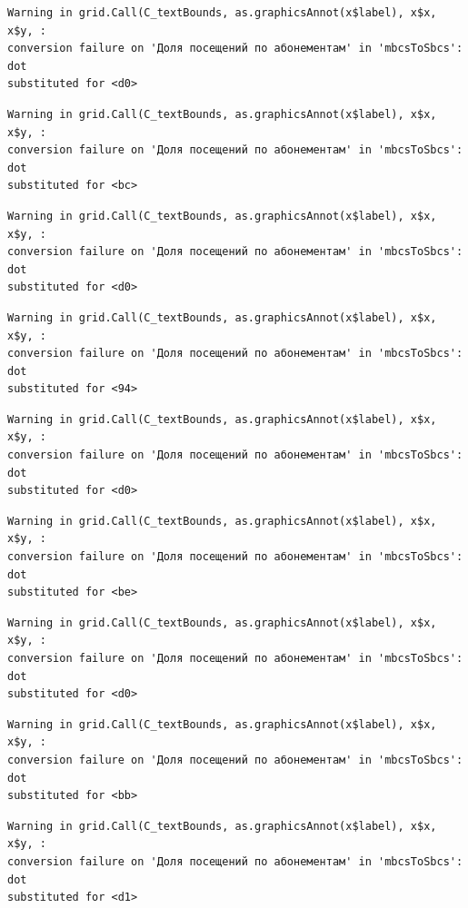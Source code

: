 \documentclass[
  letterpaper,
  DIV=11,
  numbers=noendperiod]{scrartcl}
\begin{document}
\begin{verbatim}
Warning in grid.Call(C_textBounds, as.graphicsAnnot(x$label), x$x, x$y, :
conversion failure on 'Доля посещений по абонементам' in 'mbcsToSbcs': dot
substituted for <d0>
\end{verbatim}

\begin{verbatim}
Warning in grid.Call(C_textBounds, as.graphicsAnnot(x$label), x$x, x$y, :
conversion failure on 'Доля посещений по абонементам' in 'mbcsToSbcs': dot
substituted for <bc>
\end{verbatim}

\begin{verbatim}
Warning in grid.Call(C_textBounds, as.graphicsAnnot(x$label), x$x, x$y, :
conversion failure on 'Доля посещений по абонементам' in 'mbcsToSbcs': dot
substituted for <d0>
\end{verbatim}

\begin{verbatim}
Warning in grid.Call(C_textBounds, as.graphicsAnnot(x$label), x$x, x$y, :
conversion failure on 'Доля посещений по абонементам' in 'mbcsToSbcs': dot
substituted for <94>
\end{verbatim}

\begin{verbatim}
Warning in grid.Call(C_textBounds, as.graphicsAnnot(x$label), x$x, x$y, :
conversion failure on 'Доля посещений по абонементам' in 'mbcsToSbcs': dot
substituted for <d0>
\end{verbatim}

\begin{verbatim}
Warning in grid.Call(C_textBounds, as.graphicsAnnot(x$label), x$x, x$y, :
conversion failure on 'Доля посещений по абонементам' in 'mbcsToSbcs': dot
substituted for <be>
\end{verbatim}

\begin{verbatim}
Warning in grid.Call(C_textBounds, as.graphicsAnnot(x$label), x$x, x$y, :
conversion failure on 'Доля посещений по абонементам' in 'mbcsToSbcs': dot
substituted for <d0>
\end{verbatim}

\begin{verbatim}
Warning in grid.Call(C_textBounds, as.graphicsAnnot(x$label), x$x, x$y, :
conversion failure on 'Доля посещений по абонементам' in 'mbcsToSbcs': dot
substituted for <bb>
\end{verbatim}

\begin{verbatim}
Warning in grid.Call(C_textBounds, as.graphicsAnnot(x$label), x$x, x$y, :
conversion failure on 'Доля посещений по абонементам' in 'mbcsToSbcs': dot
substituted for <d1>
\end{verbatim}
\end{document}
